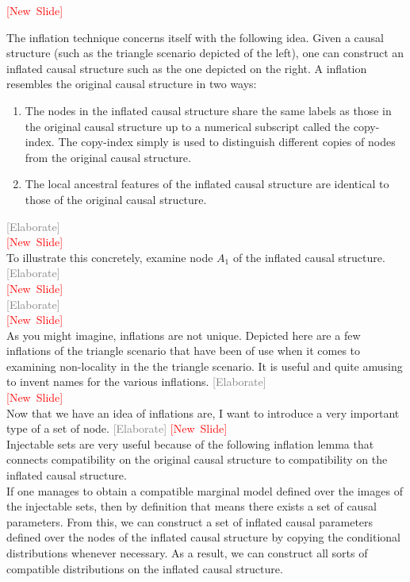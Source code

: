 \documentclass{article}
\newcommand{\newslide}{\textcolor{red}{[New~Slide]}}
\newcommand{\elaborate}{\textcolor{gray}{[Elaborate]}}
\begin{document}
    \newslide

    The inflation technique concerns itself with the following idea. Given a causal structure (such as the triangle scenario depicted of the left), one can construct an inflated causal structure such as the one depicted on the right. A inflation resembles the original causal structure in two ways:
    \begin{enumerate}
        \item The nodes in the inflated causal structure share the same labels as those in the original causal structure up to a numerical subscript called the copy-index. The copy-index simply is used to distinguish different copies of nodes from the original causal structure.
        \item The local ancestral features of the inflated causal structure are identical to those of the original causal structure.
    \end{enumerate}
    \elaborate\\

    \newslide\\
    To illustrate this concretely, examine node $A_1$ of the inflated causal structure.\\
    \elaborate\\
    \newslide\\
    \elaborate\\
    \newslide\\
    As you might imagine, inflations are not unique. Depicted here are a few inflations of the triangle scenario that have been of use when it comes to examining non-locality in the the triangle scenario. It is useful and quite amusing to invent names for the various inflations.
    \elaborate\\
    \newslide\\
    Now that we have an idea of inflations are, I want to introduce a very important type of a set of node.
    \elaborate
    \newslide\\
    Injectable sets are very useful because of the following inflation lemma that connects compatibility on the original causal structure to compatibility on the inflated causal structure.\\

    If one manages to obtain a compatible marginal model defined over the images of the injectable sets, then by definition that means there exists a set of causal parameters. From this, we can construct a set of inflated causal parameters defined over the nodes of the inflated causal structure by copying the conditional distributions whenever necessary. As a result, we can construct all sorts of compatible distributions on the inflated causal structure. \\
\end{document}
